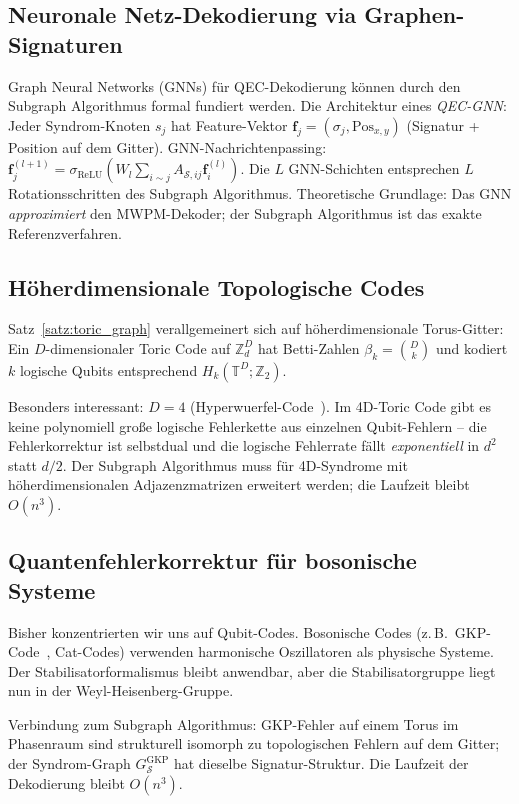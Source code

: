 ﻿\documentclass[a4paper,12pt]{article}
\theoremstyle{definition}
\begin{document}
\subsection{Neuronale Netz-Dekodierung via Graphen-Signaturen}

Graph Neural Networks (GNNs) f\"ur QEC-Dekodierung k\"onnen durch den
Subgraph Algorithmus formal fundiert werden.
Die Architektur eines \emph{QEC-GNN}: Jeder Syndrom-Knoten $s_j$ hat
Feature-Vektor $\mathbf{f}_j = (\sigma_j, \text{Pos}_{x,y})$
(Signatur + Position auf dem Gitter).
GNN-Nachrichtenpassing: $\mathbf{f}_j^{(l+1)} = \sigma_{\mathrm{ReLU}}\!\left(W_l
\sum_{i \sim j} A_{\mathcal{S},ij} \mathbf{f}_i^{(l)}\right)$.
Die $L$ GNN-Schichten entsprechen $L$ Rotationsschritten des Subgraph Algorithmus.
Theoretische Grundlage: Das GNN \emph{approximiert} den MWPM-Dekoder;
der Subgraph Algorithmus ist das exakte Referenzverfahren.

\subsection{H\"oherdimensionale Topologische Codes}

Satz~\ref{satz:toric_graph} verallgemeinert sich auf h\"oherdimensionale Torus-Gitter:
Ein $D$-dimensionaler Toric Code auf $\mathbb{Z}_d^D$ hat Betti-Zahlen
$\beta_k = \binom{D}{k}$ und kodiert $k$ logische Qubits entsprechend
$H_k(\mathbb{T}^D; \mathbb{Z}_2)$.

Besonders interessant: $D = 4$ (Hyperwuerfel-Code~\cite{dennis2002}).
Im 4D-Toric Code gibt es keine polynomiell gro{\ss}e logische Fehlerkette
aus einzelnen Qubit-Fehlern -- die Fehlerkorrektur ist selbstdual und
die logische Fehlerrate f\"allt \emph{exponentiell} in $d^2$ statt $d/2$.
Der Subgraph Algorithmus muss f\"ur 4D-Syndrome mit h\"oherdimensionalen
Adjazenzmatrizen erweitert werden; die Laufzeit bleibt $O(n^3)$.

\subsection{Quantenfehlerkorrektur f\"ur bosonische Systeme}

Bisher konzentrierten wir uns auf Qubit-Codes. Bosonische Codes
(z.\,B.\ GKP-Code~\cite{gottesman2001}, Cat-Codes) verwenden harmonische
Oszillatoren als physische Systeme. Der Stabilisatorformalismus bleibt
anwendbar, aber die Stabilisatorgruppe liegt nun in der Weyl-Heisenberg-Gruppe.

Verbindung zum Subgraph Algorithmus: GKP-Fehler auf einem Torus im Phasenraum
sind strukturell isomorph zu topologischen Fehlern auf dem Gitter;
der Syndrom-Graph $G_{\mathcal{S}}^{\mathrm{GKP}}$ hat dieselbe
Signatur-Struktur. Die Laufzeit der Dekodierung bleibt $O(n^3)$.
\end{document}
